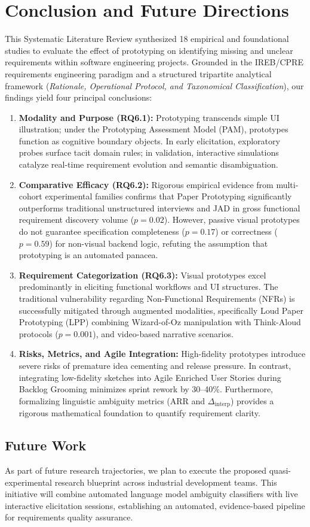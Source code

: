 \section{Conclusion and Future Directions}
\label{sec:conclusion}

This Systematic Literature Review synthesized 18 empirical and foundational studies to evaluate the effect of prototyping on identifying missing and unclear requirements within software engineering projects. Grounded in the IREB/CPRE requirements engineering paradigm and a structured tripartite analytical framework (\textit{Rationale, Operational Protocol, and Taxonomical Classification}), our findings yield four principal conclusions:

\begin{enumerate}
    \item \textbf{Modality and Purpose (RQ6.1):} Prototyping transcends simple UI illustration; under the Prototyping Assessment Model (PAM), prototypes function as cognitive boundary objects. In early elicitation, exploratory probes surface tacit domain rules; in validation, interactive simulations catalyze real-time requirement evolution and semantic disambiguation.
    \item \textbf{Comparative Efficacy (RQ6.2):} Rigorous empirical evidence from multi-cohort experimental families confirms that Paper Prototyping significantly outperforms traditional unstructured interviews and JAD in gross functional requirement discovery volume ($p = 0.02$). However, passive visual prototypes do not guarantee specification completeness ($p = 0.17$) or correctness ($p = 0.59$) for non-visual backend logic, refuting the assumption that prototyping is an automated panacea.
    \item \textbf{Requirement Categorization (RQ6.3):} Visual prototypes excel predominantly in eliciting functional workflows and UI structures. The traditional vulnerability regarding Non-Functional Requirements (NFRs) is successfully mitigated through augmented modalities, specifically Loud Paper Prototyping (LPP) combining Wizard-of-Oz manipulation with Think-Aloud protocols ($p = 0.001$), and video-based narrative scenarios.
    \item \textbf{Risks, Metrics, and Agile Integration:} High-fidelity prototypes introduce severe risks of premature idea cementing and release pressure. In contrast, integrating low-fidelity sketches into Agile Enriched User Stories during Backlog Grooming minimizes sprint rework by 30--40\%. Furthermore, formalizing linguistic ambiguity metrics (ARR and $\Delta_{\text{interp}}$) provides a rigorous mathematical foundation to quantify requirement clarity.
\end{enumerate}

\subsection{Future Work}
As part of future research trajectories, we plan to execute the proposed quasi-experimental research blueprint across industrial development teams. This initiative will combine automated language model ambiguity classifiers with live interactive elicitation sessions, establishing an automated, evidence-based pipeline for requirements quality assurance.
